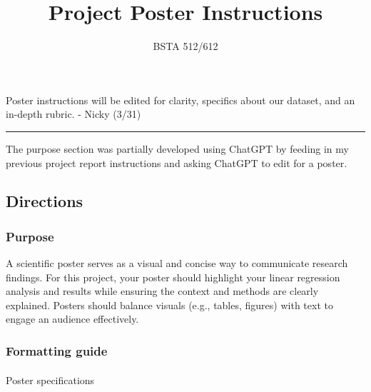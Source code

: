 \documentclass[
  letterpaper,
  DIV=11,
  numbers=noendperiod]{scrartcl}
\title{Project Poster Instructions}
\subtitle{BSTA 512/612}
\author{}
\date{}
\makeatletter
\let\oldparagraph\paragraph
\renewcommand{\paragraph}{
    \@ifstar
      \xxxParagraphStar
      \xxxParagraphNoStar
  }
\newcommand{\xxxParagraphStar}[1]{\oldparagraph*{#1}\mbox{}}
\newcommand{\xxxParagraphNoStar}[1]{\oldparagraph{#1}\mbox{}}
\makeatother
\begin{document}
\maketitle


\begin{tcolorbox}[enhanced jigsaw, opacityback=0, opacitybacktitle=0.6, rightrule=.15mm, toprule=.15mm, left=2mm, toptitle=1mm, breakable, colback=white, bottomtitle=1mm, arc=.35mm, leftrule=.75mm, titlerule=0mm, title=\textcolor{quarto-callout-important-color}{\faExclamation}\hspace{0.5em}{Important}, bottomrule=.15mm, coltitle=black, colbacktitle=quarto-callout-important-color!10!white, colframe=quarto-callout-important-color-frame]

Poster instructions will be edited for clarity, specifics about our
dataset, and an in-depth rubric. - Nicky (3/31)

\end{tcolorbox}

\begin{center}\rule{0.5\linewidth}{0.5pt}\end{center}

The purpose section was partially developed using ChatGPT by feeding in
my previous project report instructions and asking ChatGPT to edit for a
poster.

\subsection{Directions}\label{directions}

\subsubsection{Purpose}\label{purpose}

A scientific poster serves as a visual and concise way to communicate
research findings. For this project, your poster should highlight your
linear regression analysis and results while ensuring the context and
methods are clearly explained. Posters should balance visuals (e.g.,
tables, figures) with text to engage an audience effectively.

\subsubsection{Formatting guide}\label{formatting-guide}

\paragraph{Poster specifications}\label{poster-specifications}
\end{document}
